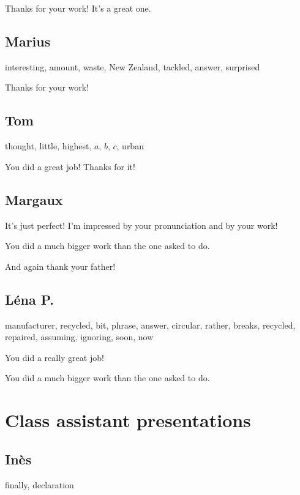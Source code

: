 \documentclass[12pt,oneside]{report}
\begin{document}
\begin{spacing}{1.2}
Thanks for your work! It's a great one.
\color{black}

\subsection*{Marius}

interesting, amount, waste, New Zealand, tackled, answer, surprised

\color{blue}
Thanks for your work!
\color{black}

\subsection*{Tom}

thought, little, highest, $a$, $b$, $c$, urban

\color{blue}
You did a great job! Thanks for it!
\color{black}

\subsection*{Margaux}

\color{blue}
It's just perfect! I'm impressed by your pronunciation and by your work!

You did a much bigger work than the one asked to do.

And again thank your father!
\color{black}

\subsection*{Léna P.}

manufacturer, recycled, bit, phrase, answer, circular, rather, breaks, recycled, repaired, assuming, ignoring, soon, now

\color{blue}
You did a really great job!

You did a much bigger work than the one asked to do.
\color{black}



\section{Class assistant presentations}

\subsection*{Inès}

finally, declaration


\end{spacing}
\end{document}
